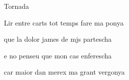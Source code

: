 \documentclass[12pt]{article}
\begin{document}
\begin{estrofaExtra}%




\begin{tornada}

Tornada

\end{tornada}


\end{estrofaExtra}


\begin{estrofa}

 Lir entre carts tot temps fare ma ponya

 que la dolor james de mjs partescha

 e no penseu que mon cas enferescha

 car maior dan merex ma grant vergonya

\end{estrofa}
\end{document}
